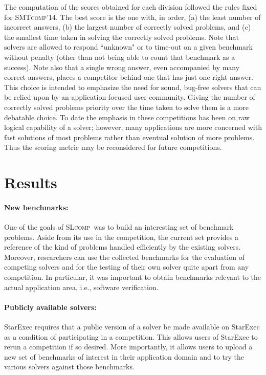 \documentclass[twoside,11pt]{article}
\newcommand{\smtcomp}{\textsc{SMTcomp}}
\newcommand{\slcomp}{\textsc{SLcomp}}
\begin{document}
The computation of the scores obtained for each division followed the rules fixed for \smtcomp'14.
The best score is the one with, in order, (a) the least number of incorrect answers, (b) the largest number of correctly solved problems, and (c) the smallest time taken in solving the correctly solved problems.
Note that solvers are allowed to respond ``unknown" or to time-out on a given benchmark without penalty (other than not being able to count that benchmark as a success).
Note also that a single wrong answer, even accompanied by many correct answers, places a competitor behind one that has just one right answer. This choice is intended to emphasize the need for sound, bug-free solvers that can be relied upon by an application-focused user community. Giving the number of correctly
solved problems priority over the time taken to solve them is a more debatable choice. To date the emphasis in these competitions has been on raw logical capability of a solver; however, many applications are more concerned with fast solutions of most problems rather than eventual solution of more problems. Thus the scoring metric may be reconsidered for future competitions.




\section{Results}

\paragraph{New benchmarks:}
One of the goals of \slcomp\ was to build an interesting set of benchmark problems. 
Aside from its use in the competition, the current set provides a reference of the kind of problems handled efficiently by the existing solvers.
Moreover, researchers can use the collected benchmarks for the evaluation of competing solvers and for the testing of their own solver quite apart from any competition. 
In particular, it was important to obtain benchmarks relevant to the actual application area, i.e., software verification.

\paragraph{Publicly available solvers:} StarExec requires that a public version of a solver be made available on StarExec as a condition of participating in a competition. This allows users of StarExec to rerun a competition if so desired. More importantly, it allows users to upload a new set of benchmarks of interest in their application domain and to try the various solvers against those benchmarks.
\end{document}
